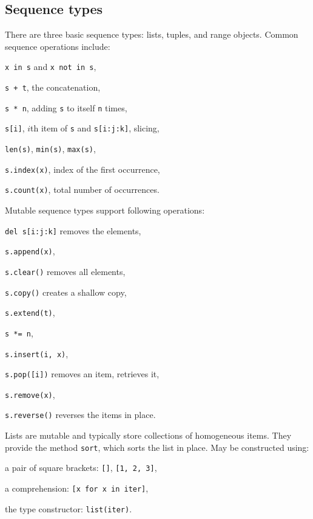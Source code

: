 \subsection{Sequence types}
There are three basic sequence types: 
lists, tuples, and range objects. 
Common sequence operations include:
\begin{compactenum}
\item \texttt{x in s} and \texttt{x not in s},
\item \texttt{s + t}, the concatenation,
\item \texttt{s * n}, adding \texttt{s} to itself \texttt{n} times,
\item \texttt{s[i]}, $i$th item of \texttt{s} and \texttt{s[i:j:k]}, slicing,
\item \texttt{len(s)}, \texttt{min(s)}, \texttt{max(s)},
\item \texttt{s.index(x)}, index of the first occurrence,
\item \texttt{s.count(x)}, total number of occurrences.
\end{compactenum}

Mutable sequence types support following operations:
\begin{compactenum}
\item \texttt{del s[i:j:k]} removes the elements,
\item \texttt{s.append(x)}, 
\item \texttt{s.clear()} removes all elements,
\item \texttt{s.copy()} creates a shallow copy, 
\item \texttt{s.extend(t)},  
\item \texttt{s *= n},  
\item \texttt{s.insert(i, x)},  
\item \texttt{s.pop([i])} removes an item, retrieves it,  
\item \texttt{s.remove(x)},  
\item \texttt{s.reverse()} reverses the items in place.  
\end{compactenum}

Lists are mutable and typically store collections of homogeneous items.
They provide the method \texttt{sort}, which sorts the list in place.
May be constructed using:
\begin{compactenum}
\item a pair of square brackets: \texttt{[]}, \texttt{[1, 2, 3]},
\item a comprehension: \texttt{[x for x in iter]}, 
\item the type constructor: \texttt{list(iter)}.
\end{compactenum}

